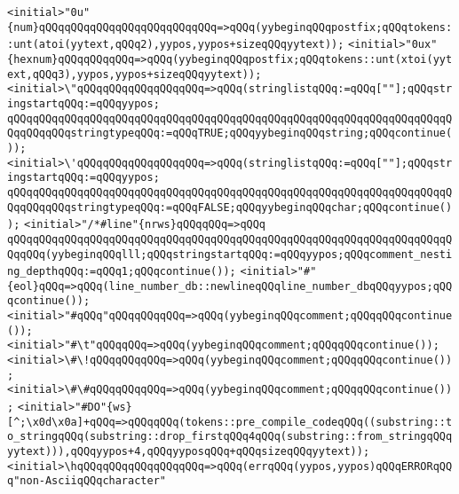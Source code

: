 \verb|<initial>"0u"{num}qQQqqQQqqQQqqQQqqQQqqQQqqQQq=>qQQq(yybeginqQQqpostfix;qQQqtokens::unt(atoi(yytext,qQQq2),yypos,yypos+sizeqQQqyytext));|\newline
\verb|<initial>"0ux"{hexnum}qQQqqQQqqQQq=>qQQq(yybeginqQQqpostfix;qQQqtokens::unt(xtoi(yytext,qQQq3),yypos,yypos+sizeqQQqyytext));|\newline
\newline
\verb|<initial>\"qQQqqQQqqQQqqQQqqQQq=>qQQq(stringlistqQQq:=qQQq[""];qQQqstringstartqQQq:=qQQqyypos;|\newline
\verb|qQQqqQQqqQQqqQQqqQQqqQQqqQQqqQQqqQQqqQQqqQQqqQQqqQQqqQQqqQQqqQQqqQQqqQQqqQQqqQQqstringtypeqQQq:=qQQqTRUE;qQQqyybeginqQQqstring;qQQqcontinue());|\newline
\verb|<initial>\'qQQqqQQqqQQqqQQqqQQq=>qQQq(stringlistqQQq:=qQQq[""];qQQqstringstartqQQq:=qQQqyypos;|\newline
\verb|qQQqqQQqqQQqqQQqqQQqqQQqqQQqqQQqqQQqqQQqqQQqqQQqqQQqqQQqqQQqqQQqqQQqqQQqqQQqqQQqstringtypeqQQq:=qQQqFALSE;qQQqyybeginqQQqchar;qQQqcontinue());|\newline
\verb|<initial>"/*#line"{nrws}qQQqqQQq=>qQQq|\newline
\verb|qQQqqQQqqQQqqQQqqQQqqQQqqQQqqQQqqQQqqQQqqQQqqQQqqQQqqQQqqQQqqQQqqQQqqQQqqQQq(yybeginqQQqlll;qQQqstringstartqQQq:=qQQqyypos;qQQqcomment_nesting_depthqQQq:=qQQq1;qQQqcontinue());|\newline
\verb|<initial>"#"{eol}qQQq=>qQQq(line_number_db::newlineqQQqline_number_dbqQQqyypos;qQQqcontinue());|\newline
\verb|<initial>"#qQQq"qQQqqQQqqQQq=>qQQq(yybeginqQQqcomment;qQQqqQQqcontinue());|\newline
\verb|<initial>"#\t"qQQqqQQq=>qQQq(yybeginqQQqcomment;qQQqqQQqcontinue());|\newline
\verb|<initial>\#\!qQQqqQQqqQQq=>qQQq(yybeginqQQqcomment;qQQqqQQqcontinue());|\newline
\verb|<initial>\#\#qQQqqQQqqQQq=>qQQq(yybeginqQQqcomment;qQQqqQQqcontinue());|\newline
\newline
\verb|<initial>"#DO"{ws}[^;\x0d\x0a]+qQQq=>qQQqqQQq(tokens::pre_compile_codeqQQq((substring::to_stringqQQq(substring::drop_firstqQQq4qQQq(substring::from_stringqQQqyytext))),qQQqyypos+4,qQQqyyposqQQq+qQQqsizeqQQqyytext));|\newline
\newline
\verb|<initial>\hqQQqqQQqqQQqqQQqqQQq=>qQQq(errqQQq(yypos,yypos)qQQqERRORqQQq"non-AsciiqQQqcharacter"|\newline
